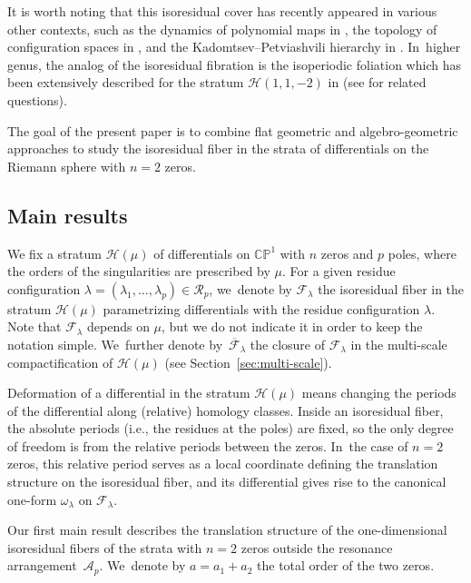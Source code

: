 \documentclass[11pt]{article}
\newcommand{\ie}{i.e.,\xspace}
\newcommand\calF{{\mathcal F}}
\theoremstyle{definition}
\begin{document}
It is worth noting that this isoresidual cover has recently appeared in various other contexts, such as the dynamics of polynomial maps in \cite{Sugiyama}, the topology of configuration spaces in \cite{SaBraid}, and the Kadomtsev--Petviashvili hierarchy in \cite{BuRoCoun}. In~higher genus, the analog of the isoresidual fibration is the isoperiodic foliation which has been extensively described for the stratum $\mathcal{H}(1,1,-2)$ in \cite{FaTaZa} (see \cite{KLS,CMDisoper,BGPA} for related questions).

The goal of the present paper is to combine flat geometric and algebro-geometric approaches to study the isoresidual fiber in the strata of differentials on the Riemann sphere with $n=2$ zeros.

\subsection{Main results}

We fix a stratum $\mathcal{H}(\mu)$ of differentials on $\mathbb{CP}^1$ with $n$ zeros and $p$ poles, where the orders of the singularities are prescribed by $\mu$. For a given residue configuration $\lambda=(\lambda_{1},\dots,\lambda_{p}) \in \mathcal{R}_{p}$, we~denote by $\mathcal{F}_{\lambda}$ the isoresidual fiber in the stratum $\mathcal{H}(\mu)$ parametrizing differentials with the residue configuration $\lambda$. Note that $\mathcal{F}_{\lambda}$ depends on $\mu$, but we do not indicate it in order to keep the notation simple. We~further denote by~$\overline{\mathcal{F}}_{\lambda}$ the closure of $\mathcal{F}_{\lambda}$ in the multi-scale compactification of $\mathcal{H}(\mu)$ (see Section~\ref{sec:multi-scale}).

Deformation of a differential in the stratum $\mathcal{H}(\mu)$ means changing the periods of the differential along (relative) homology classes. Inside an isoresidual fiber, the absolute periods (\ie the residues at the poles) are fixed, so the only degree of freedom is from the relative periods between the zeros. In~the case of $n=2$ zeros, this relative period serves as a local coordinate defining the translation structure on the isoresidual fiber, and its differential gives rise to the canonical one-form $\omega_{\lambda}$ on $\calF_{\lambda}$.

Our first main result describes the translation structure of the one-dimensional isoresidual fibers of the strata with $n=2$ zeros outside the resonance arrangement~$\mathcal{A}_{p}$. We~denote by $a = a_{1}+a_{2}$ the total order of the two zeros.
\end{document}
